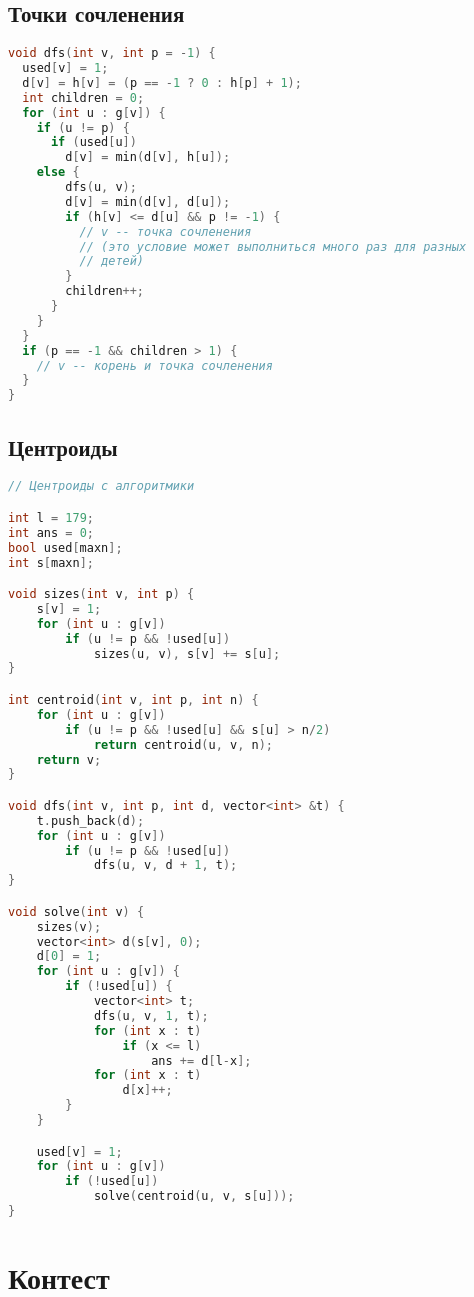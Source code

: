 \documentclass[10pt,a4paper,landscape,twosided]{extarticle}
\begin{document}
\begin{multicols}{3}
\subsection{Точки сочленения}
\begin{lstlisting}[language=C++]
void dfs(int v, int p = -1) {
  used[v] = 1;
  d[v] = h[v] = (p == -1 ? 0 : h[p] + 1);
  int children = 0;
  for (int u : g[v]) {
    if (u != p) {
      if (used[u])
        d[v] = min(d[v], h[u]);
    else {
        dfs(u, v);
        d[v] = min(d[v], d[u]);
        if (h[v] <= d[u] && p != -1) {
          // v -- точка сочленения
          // (это условие может выполниться много раз для разных
          // детей)
        }
        children++;
      }
    }
  }
  if (p == -1 && children > 1) {
    // v -- корень и точка сочленения
  }
}
\end{lstlisting}

\subsection{Центроиды}
\begin{lstlisting}[language=C++]
// Центроиды с алгоритмики

int l = 179;
int ans = 0;
bool used[maxn];
int s[maxn];

void sizes(int v, int p) {
    s[v] = 1;
    for (int u : g[v])
        if (u != p && !used[u])
            sizes(u, v), s[v] += s[u];
}

int centroid(int v, int p, int n) {
    for (int u : g[v])
        if (u != p && !used[u] && s[u] > n/2)
            return centroid(u, v, n);
    return v;
}

void dfs(int v, int p, int d, vector<int> &t) {
    t.push_back(d);
    for (int u : g[v])
        if (u != p && !used[u])
            dfs(u, v, d + 1, t);
} 

void solve(int v) {
    sizes(v);
    vector<int> d(s[v], 0);
    d[0] = 1;
    for (int u : g[v]) {
        if (!used[u]) {
            vector<int> t;
            dfs(u, v, 1, t);
            for (int x : t)
                if (x <= l)
                    ans += d[l-x];
            for (int x : t)
                d[x]++;
        }
    }

    used[v] = 1;
    for (int u : g[v])
        if (!used[u])
            solve(centroid(u, v, s[u]));
}
\end{lstlisting}

\section{Контест}


\end{multicols}
\end{document}
